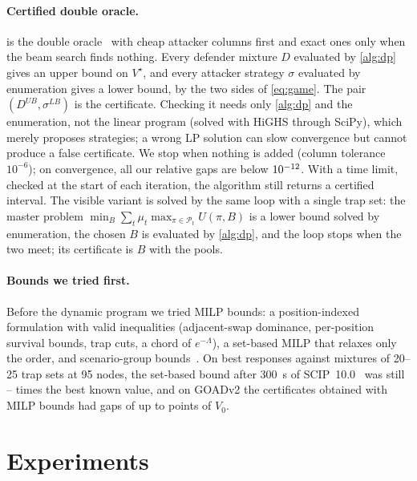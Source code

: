 \documentclass[runningheads]{llncs}
\begin{document}
\paragraph{Certified double oracle.}
 is the double oracle~\cite{mcmahan2003planning,jain2011double} with cheap attacker columns first and exact ones only when the beam search finds nothing. Every defender mixture $D$ evaluated by \cref{alg:dp} gives an upper bound on $V^\star$, and every attacker strategy $\sigma$ evaluated by enumeration gives a lower bound, by the two sides of \eqref{eq:game}. The pair $(D^{UB},\sigma^{LB})$ is the certificate. Checking it needs only \cref{alg:dp} and the enumeration, not the linear program (solved with HiGHS through SciPy), which merely proposes strategies; a wrong LP solution can slow convergence but cannot produce a false certificate. We stop when nothing is added (column tolerance $10^{-6}$); on convergence, all our relative gaps are below $10^{-12}$. With a time limit, checked at the start of each iteration, the algorithm still returns a certified interval. The visible variant is solved by the same loop with a single trap set: the master problem $\min_B\sum_t\mu_t\max_{\pi\in\mathcal P_t}U(\pi,B)$ is a lower bound solved by enumeration, the chosen $B$ is evaluated by \cref{alg:dp}, and the loop stops when the two meet; its certificate is $B$ with the pools.

\paragraph{Bounds we tried first.}
Before the dynamic program we tried MILP bounds: a position-indexed formulation with valid inequalities (adjacent-swap dominance, per-position survival bounds, trap cuts, a chord of $e^{-\Lambda}$), a set-based MILP that relaxes only the order, and scenario-group bounds~\cite{sandikci2013hierarchy}. On best responses against mixtures of 20--25 trap sets at 95 nodes, the set-based bound after 300~s of SCIP~10.0~\cite{scip} was still \SetBoundMin--\SetBoundMax{} times the best known value, and on GOADv2 the certificates obtained with MILP bounds had gaps of up to \MilpGapMax{} points of $V_0$.

\section{Experiments}\label{sec:experiments}
\end{document}
